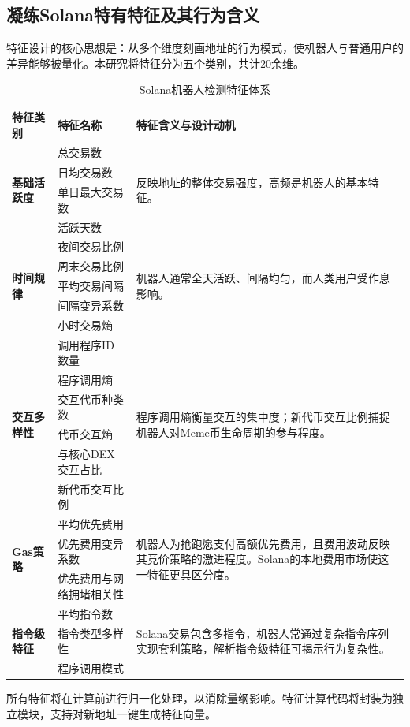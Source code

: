 \subsection{凝练Solana特有特征及其行为含义}

\par 特征设计的核心思想是：从多个维度刻画地址的行为模式，使机器人与普通用户的差异能够被量化。本研究将特征分为五个类别，共计20余维。


\begin{table}[htbp]
\centering
\caption{Solana机器人检测特征体系}
\label{tab:feature_system}
\begin{tabular}{p{2.3cm} p{3.2cm} p{7cm}}
\hline
\textbf{特征类别} & \textbf{特征名称} & \textbf{特征含义与设计动机} \\
\hline
\multirow{4}{*}{\textbf{基础活跃度}} & 总交易数 & \multirow{4}{7cm}{反映地址的整体交易强度，高频是机器人的基本特征。} \\
& 日均交易数 & \\
& 单日最大交易数 & \\
& 活跃天数 & \\
\hline
\multirow{5}{*}{\textbf{时间规律}} & 夜间交易比例 & \multirow{5}{7cm}{机器人通常全天活跃、间隔均匀，而人类用户受作息影响。} \\
& 周末交易比例 & \\
& 平均交易间隔 & \\
& 间隔变异系数 & \\
& 小时交易熵 & \\
\hline
\multirow{6}{*}{\textbf{交互多样性}} & 调用程序ID数量 & \multirow{6}{7cm}{程序调用熵衡量交互的集中度；新代币交互比例捕捉机器人对Meme币生命周期的参与程度。} \\
& 程序调用熵 & \\
& 交互代币种类数 & \\
& 代币交互熵 & \\
& 与核心DEX交互占比 & \\
& 新代币交互比例 & \\
\hline
\multirow{3}{*}{\textbf{Gas策略}} & 平均优先费用 & \multirow{3}{7cm}{机器人为抢跑愿支付高额优先费用，且费用波动反映其竞价策略的激进程度。Solana的本地费用市场使这一特征更具区分度。} \\
& 优先费用变异系数 & \\
& 优先费用与网络拥堵相关性 & \\
\hline
\multirow{3}{*}{\textbf{指令级特征}} & 平均指令数 & \multirow{3}{7cm}{Solana交易包含多指令，机器人常通过复杂指令序列实现套利策略，解析指令级特征可揭示行为复杂性。} \\
& 指令类型多样性 & \\
& 程序调用模式 & \\
\hline
\end{tabular}
\end{table}
\par 所有特征将在计算前进行归一化处理，以消除量纲影响。特征计算代码将封装为独立模块，支持对新地址一键生成特征向量。

